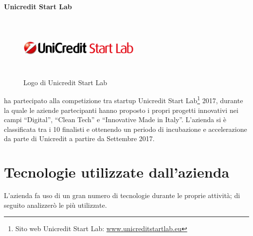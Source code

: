    \paragraph{Unicredit Start Lab}
   \begin{figure}[H]
      \begin{center}
         \includegraphics[width=6cm,height=3cm,keepaspectratio]{immagini/unicreditstartlab-logo}
      \end{center}
      \caption{Logo di Unicredit Start Lab}\label{logounicreditstartlab}
   \end{figure}
   \nomeAzienda{} ha partecipato alla competizione tra startup Unicredit Start Lab\footnote{Sito web Unicredit Start Lab: \href{http://www.unicreditstartlab.eu}{www.unicreditstartlab.eu}} 2017, durante la quale le aziende partecipanti hanno proposto i propri progetti innovativi nei campi ``Digital'', ``Clean Tech'' e ``Innovative Made in Italy''. L'azienda si è classificata tra i 10 finalisti e ottenendo un periodo di incubazione e accelerazione da parte di Unicredit a partire da Settembre 2017.

\section{Tecnologie utilizzate dall'azienda}
L'azienda fa uso di un gran numero di tecnologie durante le proprie attività; di seguito analizzerò le più utilizzate.

